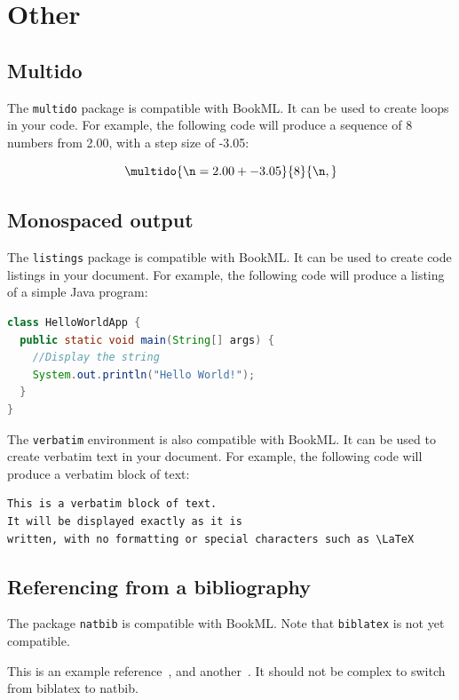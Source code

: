 \section{Other}
\subsection{Multido}
\label{demo:multido}
The \texttt{multido} package is compatible with BookML. It can be used to create loops in your code. For example, the following code will produce a sequence of 8 numbers from 2.00, with a step size of -3.05:

$$
\multido{\n=2.00+-3.05}{8}{\n, }
$$

\subsection{Monospaced output}
\label{demo:code}
The \texttt{listings} package is compatible with BookML. It can be used to create code listings in your document. For example, the following code will produce a listing of a simple Java program:


\begin{lstlisting}[language=Java]
class HelloWorldApp {
  public static void main(String[] args) {
    //Display the string
    System.out.println("Hello World!");
  }
}
\end{lstlisting}
The \texttt{verbatim} environment is also compatible with BookML. It can be used to create verbatim text in your document. For example, the following code will produce a verbatim block of text:

\begin{verbatim}
This is a verbatim block of text.
It will be displayed exactly as it is 
written, with no formatting or special characters such as \LaTeX
\end{verbatim}

\subsection{Referencing from a bibliography}
\label{bib}

The package \texttt{natbib} is compatible with BookML. Note that \texttt{biblatex} is not yet compatible.

This is an example reference~\cite{strikwerda2004}, and another~\citep{parret2016time}. It should not be complex to switch from biblatex to natbib. 


